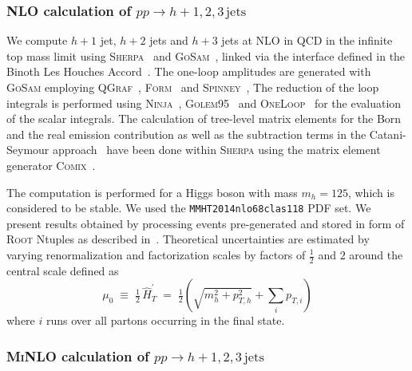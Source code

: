 \subsubsection{NLO calculation of $pp\to h+1,2,3\,\text{jets}$}
\label{sec:hjetscomp:tools:fo:hnj}

We compute $h+1$ jet, $h+2$ jets and
$h+3$ jets at NLO in QCD in the infinite top mass limit
using \textsc{Sherpa}~\cite{Gleisberg:2008ta} and
\textsc{GoSam}~\cite{Cullen:2011ac,Cullen:2014yla}, linked via the
interface defined in the Binoth Les Houches
Accord~\cite{Binoth:2010xt,Alioli:2013nda}.
The one-loop amplitudes are generated with \textsc{GoSam} employing
\textsc{QGraf}~\cite{Nogueira:1991ex},
\textsc{Form}~\cite{Vermaseren:2000nd,Kuipers:2012rf} and
\textsc{Spinney}~\cite{Cullen:2010jv}, The reduction of the loop
integrals is performed using
\textsc{Ninja}~\cite{Mastrolia:2012bu,vanDeurzen:2013saa,Peraro:2014cba},
\textsc{Golem95}~\cite{Heinrich:2010ax,Binoth:2008uq,Cullen:2011kv}
and \textsc{OneLoop}~\cite{vanHameren:2010cp} for the evaluation of
the scalar integrals.
The calculation of tree-level matrix elements for the Born and the
real emission contribution as well as the subtraction terms in the
Catani-Seymour approach~\cite{Catani:1996vz} have been done within
\textsc{Sherpa} using the matrix element generator
\textsc{Comix}~\cite{Gleisberg:2008fv}.

The computation is performed for a Higgs boson with mass
$m_h=125$, which is considered to be stable. We used the 
\texttt{MMHT2014nlo68clas118} PDF set. We present results 
obtained by processing events pre-generated and
stored in form of \textsc{Root} Ntuples as described
in~\cite{Bern:2013zja}. Theoretical
uncertainties are estimated by varying renormalization and
factorization scales by factors of $\tfrac{1}{2}$ and $2$ 
around the central scale defined as
\begin{equation}\label{eq:gosamScale}
  \mu_0\;\equiv\;\tfrac{1}{2}\,\hat{H}^\prime_T
            \;=\;\tfrac{1}{2}\left(\sqrt{m_h^{2}+p_{T,h}^{2}}
                                    +\sum_{i}p_{T,i}^{}\right)
\end{equation}
where $i$ runs over all partons occurring in the final state.


\subsubsection{\textsc{MiNLO} calculation of $pp\to h+1,2,3\,\text{jets}$}
\label{sec:hjetscomp:tools:fo:hnjminlo}

